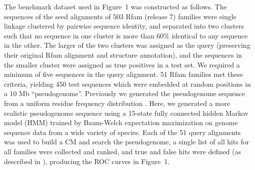 The benchmark dataset used in Figure~1 
was constructed as follows. The sequences of the seed
alignments of 503 Rfam (release 7) families were single linkage
clustered by pairwise sequence identity, and separated into two
clusters such that no sequence in one cluster is more than 60\%
identical to any sequence in the other. The larger of the two clusters
was assigned as the query (preserving their original Rfam alignment
and structure annotation), and the sequences in the smaller cluster
were assigned as true positives in a test set. We required a minimum
of five sequences in the query alignment. 51 Rfam families met these
criteria, yielding 450 test sequences which were embedded at random
positions in a 10 Mb ``pseudogenome''.  
Previously we generated the
pseudogenome sequence from a uniform residue frequency distribution \citep{NawrockiEddy07}.
Here, we generated a more realistic pseudogenome sequence using a
15-state fully connected hidden Markov model (HMM) trained by
Baum-Welch expectation maximization \citep{Durbin98} on genome
sequence data from a wide variety of species.  Each of the 51 query
alignments was used to build a CM and search the pseudogenome, a
single list of all hits for all families were collected and ranked,
and true and false hits were defined (as described in
\citet{NawrockiEddy07}), producing the ROC curves in Figure~1.


